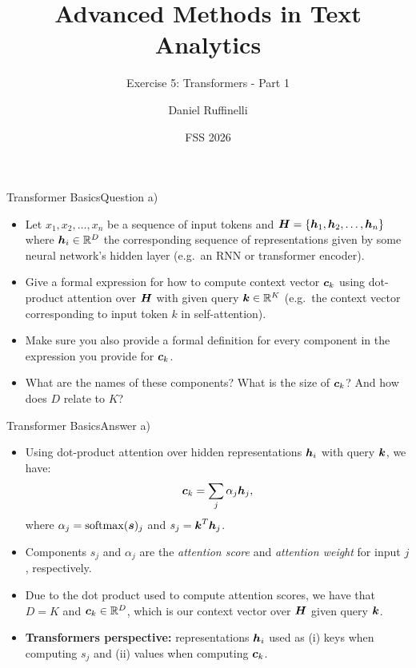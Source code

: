 \documentclass[t]{beamer}
\title[Write your short title here]{Advanced Methods in Text Analytics}
\subtitle{Exercise 5: Transformers - Part 1}
\author{Daniel Ruffinelli}
\institute{University of Mannheim}
\date{FSS 2026}
\begin{document}

\begin{frame}
    \titlepage{}
\end{frame}

\begin{frame}{Transformer Basics}{Question a)}
    \begin{itemize}
        \item Let $x_1,x_2,\ldots, x_n$ be a sequence of input tokens and
              ${\boldsymbol{H}} = \{{\boldsymbol{h}}_1,{\boldsymbol{h}}_2,\ldots, {\boldsymbol{h}}_n\}$ where ${\boldsymbol{h}}_i\in\mathbb{R}^D$ the
              corresponding sequence of representations given by some neural
              network's hidden layer (e.g.\ an RNN or transformer encoder).
        \item Give a formal expression for how to compute context vector ${\boldsymbol{c}}_k$
              using dot-product attention over ${\boldsymbol{H}}$ with given query
              ${\boldsymbol{k}}\in\mathbb{R}^K$ (e.g.\ the context vector corresponding to input
              token $k$ in self-attention).
        \item Make sure you also provide a formal definition for every component
              in the expression you provide for ${\boldsymbol{c}}_k$.
        \item What are the names of these components? What is the size of
              ${\boldsymbol{c}}_k$? And how does $D$ relate to $K$?
    \end{itemize}
\end{frame}

\begin{frame}{Transformer Basics}{Answer a)}
    \begin{itemize}
        \item Using dot-product attention over hidden representations ${\boldsymbol{h}}_i$
              with query ${\boldsymbol{k}}$, we have:
              \begin{align*}
                  {\boldsymbol{c}}_k = \sum_j \alpha_j{\boldsymbol{h}}_j,
              \end{align*}
              where $\alpha_j= \operatorname{softmax}({\boldsymbol{s}})_j$ and
              $s_j = {\boldsymbol{k}}^T{\boldsymbol{h}}_j$.
              \pause
        \item Components $s_j$ and $\alpha_j$ are the \emph{attention score} and
              \emph{attention weight} for input $j$, respectively.
              \pause
        \item Due to the dot product used to compute attention scores, we have
              that $D = K$ and ${\boldsymbol{c}}_k\in\mathbb{R}^D$, which is our context vector
              over ${\boldsymbol{H}}$ given query ${\boldsymbol{k}}$.
              \pause
        \item \textbf{Transformers perspective:} representations ${\boldsymbol{h}}_i$ used as
              (i) keys when computing $s_j$ and (ii) values when computing
              ${\boldsymbol{c}}_k$.
    \end{itemize}
\end{frame}
\end{document}

